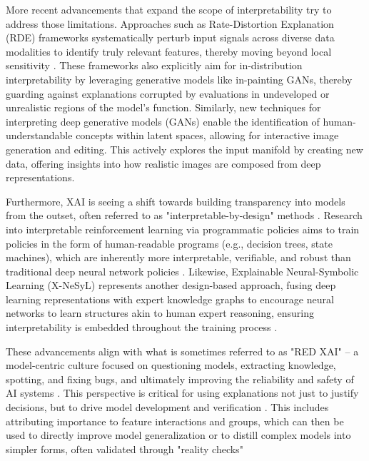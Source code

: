 \documentclass[licencjacka,en]{pracamgr}
\begin{document}
More recent advancements that expand the scope of interpretability try to address those limitations. Approaches such as Rate-Distortion Explanation (RDE) frameworks systematically perturb input signals across diverse data modalities to identify truly relevant features, thereby moving beyond local sensitivity \citep{Kolek2022}. These frameworks also explicitly aim for in-distribution interpretability by leveraging generative models like in-painting GANs, thereby guarding against explanations corrupted by evaluations in undeveloped or unrealistic regions of the model's function. Similarly, new techniques for interpreting deep generative models (GANs) enable the identification of human-understandable concepts within latent spaces, allowing for interactive image generation and editing. This actively explores the input manifold by creating new data, offering insights into how realistic images are composed from deep representations. \citep{zhou2022interpretinggenerativeadversarialnetworks, Karimi2022}

Furthermore, XAI is seeing a shift towards building transparency into models from the outset, often referred to as "interpretable-by-design" methods \citep{Karimi2022, Holzinger2022a}. Research into interpretable reinforcement learning via programmatic policies aims to train policies in the form of human-readable programs (e.g., decision trees, state machines), which are inherently more interpretable, verifiable, and robust than traditional deep neural network policies \citep{inbook, Inala2020Synthesizing, verma2019programmaticallyinterpretablereinforcementlearning}. Likewise, Explainable Neural-Symbolic Learning (X-NeSyL) represents another design-based approach, fusing deep learning representations with expert knowledge graphs to encourage neural networks to learn structures akin to human expert reasoning, ensuring interpretability is embedded throughout the training process \citep{D_az_Rodr_guez_2022, karimi2020algorithmicrecoursecounterfactualexplanations}.

These advancements align with what is sometimes referred to as "RED XAI" – a model-centric culture focused on questioning models, extracting knowledge, spotting, and fixing bugs, and ultimately improving the reliability and safety of AI systems \citep{10.5555/3692070.3692231}. This perspective is critical for using explanations not just to justify decisions, but to drive model development and verification \citep{Tsai2022}. This includes attributing importance to feature interactions and groups, which can then be used to directly improve model generalization or to distill complex models into simpler forms, often validated through "reality checks" \citep{Singh2022}
\end{document}
